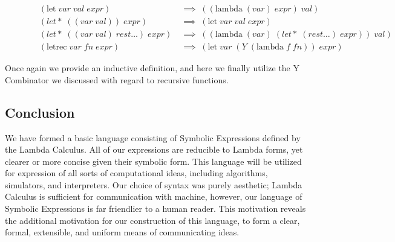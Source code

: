 \begin{figure}[htp]
\caption{}\label{scheme}
\begin{align*}
& (\text{let} \; var \; val \; expr) \; &\implies \; ((\text{lambda} \; (var) \; expr) \; val)
\\& (let* \; ((var \; val)) \; expr) \; &\implies \; (\text{let} \; var \; val \; expr)
\\& (let* \; ((var \; val) \; rest\dots) \; expr) \; &\implies \; ((\text{lambda} \; (var) \; (let* \; (rest\dots) \; expr)) \; val)
\\& (\text{letrec} \; var \; fn \; expr) \; &\implies \; (\text{let} \; var \; (Y \; (\text{lambda} \; f \; fn)) \; expr)
\end{align*}
\end{figure}

Once again we provide an inductive definition, and here we finally utilize the Y 
Combinator we discussed with regard to recursive functions.

\subsection{Conclusion}
We have formed a basic language consisting of Symbolic Expressions defined by the 
Lambda Calculus. All of our expressions are reducible to Lambda forms, yet clearer 
or more concise given their symbolic form. This language will be utilized for 
expression of all sorts of computational ideas, including algorithms, simulators, 
and interpreters. Our choice of syntax was purely aesthetic; Lambda Calculus is 
sufficient for communication with machine, however, our language of Symbolic 
Expressions is far friendlier to a human reader. This motivation reveals the 
additional motivation for our construction of this language, to form a clear, 
formal, extensible, and uniform means of communicating ideas.
